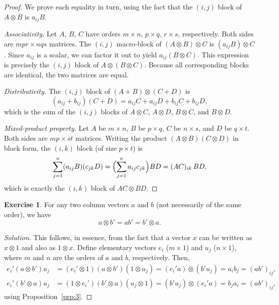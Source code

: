 \documentclass[14pt]{extarticle}
\theoremstyle{plain}
\theoremstyle{definition}
\newtheorem{exercise}{Exercise}
\theoremstyle{remark}
\newenvironment{solution}{%
  \begin{proof}[Solution]%
}{%
  \end{proof}%
}
\begin{document}
\begin{proof}
We prove each equality in turn, using the fact that the $(i,j)$ block of $A \otimes B$ is $a_{ij}B$.

\emph{Associativity.} Let $A$, $B$, $C$ have orders $m \times n$, $p \times q$, $r \times s$, respectively. Both sides are $mpr \times nqs$ matrices. The $(i,j)$ macro-block of $(A \otimes B) \otimes C$ is $(a_{ij}B) \otimes C$. Since $a_{ij}$ is a scalar, we can factor it out to yield $a_{ij}(B \otimes C)$. This expression is precisely the $(i,j)$ block of $A \otimes (B \otimes C)$. Because all corresponding blocks are identical, the two matrices are equal.

\emph{Distributivity.} The $(i,j)$ block of $(A + B) \otimes (C + D)$ is
\[
(a_{ij} + b_{ij})(C + D) = a_{ij}C + a_{ij}D + b_{ij}C + b_{ij}D,
\]
which is the sum of the $(i,j)$ blocks of $A \otimes C$, $A \otimes D$, $B \otimes C$, and $B \otimes D$.

\emph{Mixed-product property.} Let $A$ be $m \times n$, $B$ be $p \times q$, $C$ be $n \times s$, and $D$ be $q \times t$. Both sides are $mp \times st$ matrices. Writing the product $(A \otimes B)(C \otimes D)$ in block form, the $(i,k)$ block (of size $p \times t$) is
\[
\sum_{j=1}^{n} (a_{ij}B)(c_{jk}D) = \Bigl(\sum_{j=1}^{n} a_{ij}c_{jk}\Bigr) BD = (AC)_{ik}\, BD,
\]
which is exactly the $(i,k)$ block of $AC \otimes BD$.
\end{proof}

\begin{exercise}\label{exer:1}
For any two column vectors $a$ and $b$ (not necessarily of the same order), we have
\[
a \otimes b' = ab' = b' \otimes a.
\]
\end{exercise}

\begin{solution}
This follows, in essence, from the fact that a vector $x$ can be written as $x \otimes 1$ and also as $1 \otimes x$.
Define elementary vectors $e_i$ ($m \times 1$) and $u_j$ ($n \times 1$), where $m$ and $n$ are the orders of $a$ and $b$, respectively. Then,
\begin{align*}
e_i'(a \otimes b')u_j &= (e_i' \otimes 1)(a \otimes b')(1 \otimes u_j)
= (e_i'a) \otimes (b'u_j) = a_i b_j = (ab')_{ij}, \\
e_i'(b' \otimes a)u_j &= (1 \otimes e_i')(b' \otimes a)(u_j \otimes 1)
= (b'u_j) \otimes (e_i'a) = b_j a_i = (ab')_{ij},
\end{align*}
using Proposition~\ref{prp:3}.
\end{solution}
\end{document}
